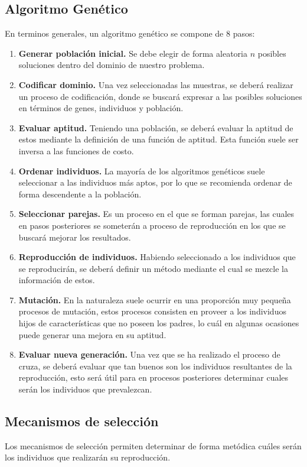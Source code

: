 \subsection{Algoritmo Genético}
En terminos generales, un algoritmo genético se compone de 8 pasos:

\begin{enumerate}
	\item \textbf{Generar población inicial.} Se debe elegir de forma aleatoria $n$ posibles soluciones dentro del dominio de nuestro problema.
	\item \textbf{Codificar dominio.} Una vez seleccionadas las muestras, se deberá realizar un proceso de codificación, donde se buscará expresar a las posibles soluciones en términos de genes, individuos y población.
	\item \textbf{Evaluar aptitud.} Teniendo una población, se deberá evaluar la aptitud de estos mediante la definición de una función de aptitud. Esta función suele ser inversa a las funciones de costo.
	\item \textbf{Ordenar individuos.} La mayoría de los algoritmos genéticos suele seleccionar a las individuos más aptos, por lo que se recomienda ordenar de forma descendente a la población.
	\item \textbf{Seleccionar parejas.} Es un proceso en el que se forman parejas, las cuales en pasos posteriores se someterán a proceso de reproducción en los que se buscará mejorar los resultados.
	\item \textbf{Reproducción de individuos.} Habiendo seleccionado a los individuos que se reproducirán, se deberá definir un método mediante el cual se mezcle la información de estos.
	\item \textbf{Mutación.} En la naturaleza suele ocurrir en una proporción muy pequeña procesos de mutación, estos procesos consisten en proveer a los individuos hijos de características que no poseen los padres, lo cuál en algunas ocasiones puede generar una mejora en su aptitud.
	\item \textbf{Evaluar nueva generación.} Una vez que se ha realizado el proceso de cruza, se deberá evaluar que tan buenos son los individuos resultantes de la reproducción, esto será útil para en procesos posteriores determinar cuales serán los individuos que prevalezcan.
\end{enumerate}

\subsection{Mecanismos de selección}
Los mecanismos de selección permiten determinar de forma metódica cuáles serán los individuos que realizarán su reproducción.

